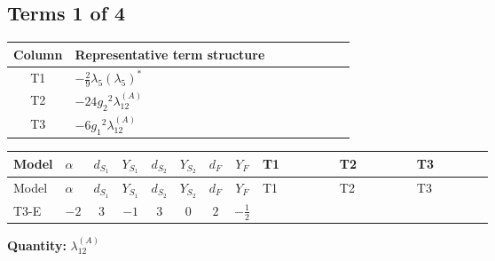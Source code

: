 \documentclass[8pt]{article}
\begin{document}
\begin{landscape}
\subsection*{Terms 1 of 4}
\begin{center}
\begin{tabular}{@{}c >{\raggedright\arraybackslash}p{0.82\linewidth}@{}}
\toprule
Column & Representative term structure \\
\midrule
T1 & \(\displaystyle -\frac{2}{9} {\lambda_5} \left({\lambda_5}\right)^{*}\) \\
\midrule
T2 & \(\displaystyle -24 {g_2}^2 {\lambda_{12}^{(A)}}\) \\
\midrule
T3 & \(\displaystyle -6 {g_1}^2 {\lambda_{12}^{(A)}}\) \\
\midrule
\bottomrule
\end{tabular}
\end{center}
\smallskip
\tiny
\begin{longtable}{@{}llcccccc >{\raggedright\arraybackslash}p{0.21\linewidth} >{\raggedright\arraybackslash}p{0.21\linewidth} >{\raggedright\arraybackslash}p{0.21\linewidth}@{}}
\toprule
Model & $\alpha$ & $d_{S_1}$ & $Y_{S_1}$ & $d_{S_2}$ & $Y_{S_2}$ & $d_F$ & $Y_F$ & T1 & T2 & T3 \\
\midrule
\endfirsthead
\toprule
Model & $\alpha$ & $d_{S_1}$ & $Y_{S_1}$ & $d_{S_2}$ & $Y_{S_2}$ & $d_F$ & $Y_F$ & T1 & T2 & T3 \\
\midrule
\endhead
T3-E & $-2$ & $3$ & $-1$ & $3$ & $0$ & $2$ & $-\frac{1}{2}$ & \scriptsize\adjustbox{max width=\linewidth}{$\begin{gathered} -\frac{2}{9} {\lambda_5} \left({\lambda_5}\right)^{*}\end{gathered}$} & \scriptsize\adjustbox{max width=\linewidth}{$\begin{gathered} -24 {g_2}^2 {\lambda_{12}^{(A)}}\end{gathered}$} & \scriptsize\adjustbox{max width=\linewidth}{$\begin{gathered} -6 {g_1}^2 {\lambda_{12}^{(A)}}\end{gathered}$} \\
\midrule
\bottomrule
\end{longtable}
\clearpage
\noindent\textbf{Quantity: }$\lambda_{12}^{(A)}$\par\smallskip

\end{landscape}
\end{document}
